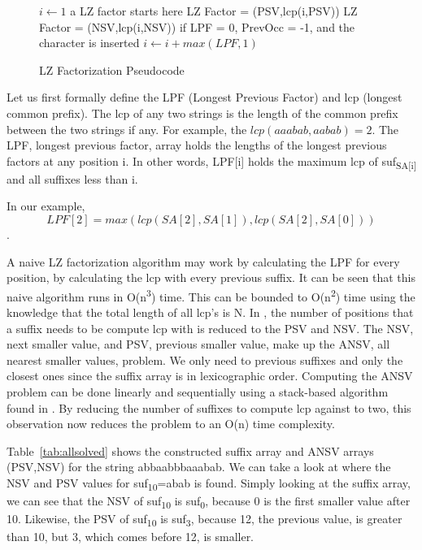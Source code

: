 \begin{figure}
\begin{algorithmic}[1]
\State $i \gets 1$
\State a LZ factor starts here
\State LZ Factor = (PSV,lcp(i,PSV))
\Else
\State LZ Factor = (NSV,lcp(i,NSV))
\EndIf
\State if LPF = 0, PrevOcc = -1, and the character is inserted
\State $i \gets i + max(LPF,1)$\EndWhile
\EndProcedure
\end{algorithmic}
\caption{LZ Factorization Pseudocode}
\label{algorithm:lzfactorization}
\end{figure}

Let us first formally define the LPF (Longest Previous Factor) and lcp (longest common prefix).
The lcp of any two strings is the length of the common prefix between the two strings if any. 
For example, the $lcp(aaabab,aabab)=2$.
The LPF, longest previous factor, array holds the lengths of the longest previous factors at any position i.
In other words, LPF[i] holds the maximum lcp of suf\textsubscript{SA[i]} and all suffixes less than i.

In our example, $$LPF[2]=max(lcp(SA[2],SA[1]),lcp(SA[2],SA[0]))$$.

A naive LZ factorization algorithm may work by calculating the LPF for every position, by calculating the lcp with every previous suffix.
It can be seen that this naive algorithm runs in O(n\textsuperscript{3}) time.
This can be bounded to O(n\textsuperscript{2}) time using the knowledge that the total length of all lcp's is N.
In \cite{crochemore2008computing}, the number of positions that a suffix needs to be compute lcp with is reduced to the PSV and NSV.
The NSV, next smaller value, and PSV, previous smaller value, make up the ANSV, all nearest smaller values, problem.
We only need to previous suffixes and only the closest ones since the suffix array is in lexicographic order.
Computing the ANSV problem can be done linearly and sequentially using a stack-based algorithm found in \cite{gabow1984scaling}.
By reducing the number of suffixes to compute lcp against to two, this observation now reduces the problem to an O(n) time complexity.

Table~\ref{tab:allsolved} shows the constructed suffix array and ANSV arrays (PSV,NSV) for the string abbaabbbaaabab.
We can take a look at where the NSV and PSV values for suf\textsubscript{10}=abab is found.
Simply looking at the suffix array, we can see that the NSV of suf\textsubscript{10} is suf\textsubscript{0}, because 0 is the first smaller value after 10.
Likewise, the PSV of suf\textsubscript{10} is suf\textsubscript{3}, because 12, the previous value, is greater than 10, but 3, which comes before 12, is smaller.

